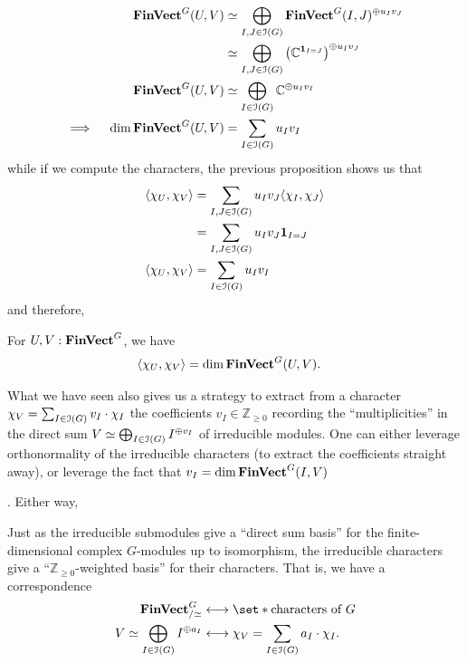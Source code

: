 \begin{align*}
  \operatorname{\mathbf{FinVect}}^G (U, V)
  &\simeq \bigoplus_{I, J \in \operatorname{\mathcal{I}}(G)} \operatorname{\mathbf{FinVect}}^G (I, J)^{\oplus u_I v_J}
  \\
  &\simeq \bigoplus_{I, J \in \operatorname{\mathcal{I}}(G)} \left( \mathbb{C}^{\mathbf{1}_{I = J}} \right)^{\oplus u_I v_J}
  \\
  \operatorname{\mathbf{FinVect}}^G (U, V)
  &\simeq \bigoplus_{I \in \operatorname{\mathcal{I}}(G)} \mathbb{C}^{\oplus u_I v_I}
  \\
  \implies\quad
  \dim \operatorname{\mathbf{FinVect}}^G (U, V)
  &= \sum_{I \in \operatorname{\mathcal{I}}(G)} u_I v_I
\end{align*}
while if we compute the characters, the previous proposition shows us that
\begin{align*}
  \langle \chi_U, \chi_V \rangle
  &= \sum_{I, J \in \operatorname{\mathcal{I}}(G)} u_I v_J \langle \chi_I, \chi_J \rangle
  \\
  &= \sum_{I, J \in \operatorname{\mathcal{I}}(G)} u_I v_J \mathbf{1}_{I = J}
  \\
  \langle \chi_U, \chi_V \rangle
  &= \sum_{I \in \operatorname{\mathcal{I}}(G)} u_I v_I
\end{align*}
and therefore,
\begin{theorem}
\label{result:inner-product-dimension}
  \pan For $U, V : \operatorname{\mathbf{FinVect}}^G$, we have
  \begin{align*}
    \langle \chi_U, \chi_V \rangle
    &= \dim \operatorname{\mathbf{FinVect}}^G (U, V)
    .
  \end{align*}
\end{theorem}
\par What we have seen also gives us a strategy to extract from a character $\chi_V = \sum_{I \in \operatorname{\mathcal{I}}(G)} v_I \cdot \chi_{I}$ the coefficients $v_I \in \mathbb{Z}_{\geq 0}$ recording the ``multiplicities'' in the direct sum $V \simeq \bigoplus_{I \in \operatorname{\mathcal{I}}(G)} I^{\oplus v_I}$ of irreducible modules. One can either leverage orthonormality of the irreducible characters (to extract the coefficients straight away), or leverage the fact that $v_I = \dim \operatorname{\mathbf{FinVect}}^G (I, V)$ . Either way,
\begin{theorem}
\label{result:irreducible-basis}
  \pan Just as the irreducible submodules give a ``direct sum basis'' for the finite-dimensional complex $G$-modules up to isomorphism, the irreducible characters give a ``$\mathbb{Z}_{\geq 0}$-weighted basis'' for their characters. That is, we have a correspondence
  \begin{align*}
    \FinVect^G_{/{\simeq}}
    &\longleftrightarrow
    \set*{ \text{characters of } G }
    \\
    V
    \simeq \bigoplus_{I \in \Irred(G)} I^{\oplus a_I}
    &\longleftrightarrow
    \chi_V
    = \sum_{I \in \Irred(G)} a_I \cdot \chi_{I}
    .
  \end{align*}
\end{theorem}
